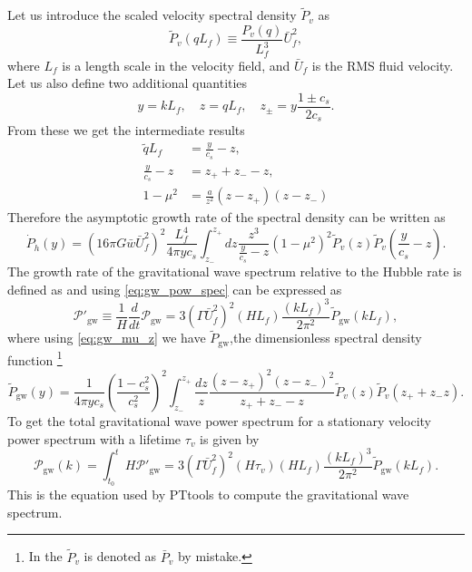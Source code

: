 Let us introduce the scaled velocity spectral density $\tilde{P}_v$ as
\begin{equation}
\tilde{P}_v(qL_f) \equiv \frac{P_v(q)}{L_f^3} \bar{U}_f^2,
\end{equation}
where $L_f$ is a length scale in the velocity field, and $\bar{U}_f$ is the RMS fluid velocity.
Let us also define two additional quantities
\begin{equation}
y = kL_f, \quad z = qL_f, \quad z_\pm = y \frac{1 \pm c_s}{2 c_s}.
\label{eq:gw_yz}
\end{equation}
From these we get the intermediate results
\begin{align}
\tilde{q}L_f &= \frac{y}{c_s} - z, \\
\frac{y}{c_s} - z &= z_+ + z_- - z, \\
1 - \mu^2 &= \frac{a}{z^2}(z-z_+)(z-z_-)
\label{eq:gw_mu_z}
\end{align}
Therefore the asymptotic growth rate of the spectral density can be written as
\begin{equation}
\dot{P}_{\dot{h}}(y) =
\left( 16 \pi G \bar{w} \bar{U}_f^2 \right)^2
\frac{L_f^4}{4 \pi y c_s}
\int_{z_-}^{z_+} dz
\frac{z^3}{\frac{y}{c_s} - z}
(1 - \mu^2)^2
\tilde{P}_v (z) \tilde{P}_v (\frac{y}{c_s} - z).
\end{equation}
The growth rate of the gravitational wave spectrum relative to the Hubble rate is defined as and using \eqref{eq:gw_pow_spec} can be expressed as
\cite[eq. 3.46]{hindmarsh_gw_pt_2019}
\begin{equation}
\mathcal{P}'_{\text{gw}} \equiv \frac{1}{H} \frac{d}{dt} \mathcal{P}_{\text{gw}}
= 3 \left( \Gamma \bar{U}_f^2 \right)^2 (HL_f) \frac{(kL_f)^3}{2 \pi^2} \tilde{P}_{\text{gw}} (kL_f),
\end{equation}
where using \eqref{eq:gw_mu_z} we have $\tilde{P}_{\text{gw}}$,the dimensionless spectral density function
\cite[eq. 3.47]{hindmarsh_gw_pt_2019}
\footnote{In \cite{hindmars_gw_pt_2019} the $\tilde{P}_v$ is denoted as $\bar{P}_v$ by mistake.}
\begin{equation}
\tilde{P}_\text{gw} (y) = \frac{1}{4\pi yc_s} \left(\frac{1-c_s^2}{c_s^2}\right)^2
\int_{z_-}^{z_+} \frac{dz}{z}
\frac{(z-z_+)^2(z-z_-)^2}{z_+ + z_- - z}
\tilde{P}_v (z) \tilde{P}_v (z_+ + z_- z).
\label{eq:spectral_density}
\end{equation}
To get the total gravitational wave power spectrum for a stationary velocity power spectrum with a lifetime $\tau_v$ is given by
\begin{equation}
\mathcal{P}_\text{gw}(k)
= \int_{t_0}^{t} H \mathcal{P}'_\text{gw}
= 3 \left( \Gamma \bar{U}_f^2 \right)^2 (H \tau_v)(H L_f) \frac{(kL_f)^3}{2\pi^2} \tilde{P}_\text{gw} (kL_f).
\label{eq:pow_gw}
\end{equation}
This is the equation used by PTtools to compute the gravitational wave spectrum.



\cites{hindmarsh_gw_pt_2019}[ch. 8]{lecture_notes}
